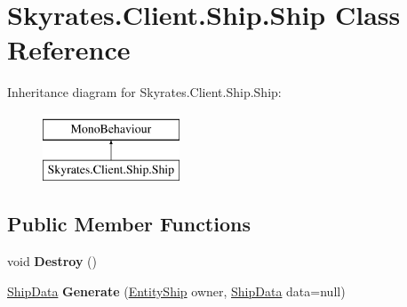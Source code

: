 \hypertarget{class_skyrates_1_1_client_1_1_ship_1_1_ship}{\section{Skyrates.\-Client.\-Ship.\-Ship Class Reference}
\label{class_skyrates_1_1_client_1_1_ship_1_1_ship}
}
Inheritance diagram for Skyrates.\-Client.\-Ship.\-Ship\-:\begin{figure}[H]
\begin{center}
\leavevmode
\includegraphics[height=2.000000cm]{class_skyrates_1_1_client_1_1_ship_1_1_ship}
\end{center}
\end{figure}
\subsection*{Public Member Functions}
\begin{DoxyCompactItemize}
\item 
\hypertarget{class_skyrates_1_1_client_1_1_ship_1_1_ship_a0e10ad8211decc8c7bbb4c9ff49c3e17}{void {\bfseries Destroy} ()}\label{class_skyrates_1_1_client_1_1_ship_1_1_ship_a0e10ad8211decc8c7bbb4c9ff49c3e17}

\item 
\hypertarget{class_skyrates_1_1_client_1_1_ship_1_1_ship_a3a126b748f8c3265ab2d054c8c11ded7}{\hyperlink{class_ship_data}{Ship\-Data} {\bfseries Generate} (\hyperlink{class_skyrates_1_1_common_1_1_entity_1_1_entity_ship}{Entity\-Ship} owner, \hyperlink{class_ship_data}{Ship\-Data} data=null)}\label{class_skyrates_1_1_client_1_1_ship_1_1_ship_a3a126b748f8c3265ab2d054c8c11ded7}

\end{DoxyCompactItemize}
